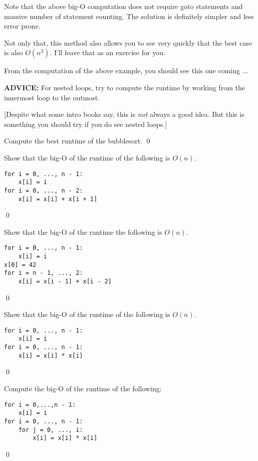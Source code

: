 \newpage

Note that the above big-O computation does not require goto statements
and massive number of statement counting.
The solution is definitely simpler and less error prone.

Not only that, this method also allows you to see very quickly
that the best case is also $O(n^2)$.
I'll leave that as an exercise for you.

From the computation of the above
example, you should see this one coming ...

\textbf{ADVICE:} For nested loops, try to  
compute the runtime by working from the innermost loop to the outmost.


[Despite what some intro books say, this is \textit{ not} always a good idea.
But this is something you should try if you do see nested loops.]


\begin{ex}
Compute the best runtime of the bubblesort.
\qed
\end{ex}

\begin{ex}
Show that the big-O of the runtime of the following is $O(n)$.
\begin{Verbatim}[frame=single, fontsize=\footnotesize]
for i = 0, ..., n - 1:
    x[i] = i
for i = 0, ..., n - 2:
    x[i] = x[i] + x[i + 1]
\end{Verbatim}
\qed
\end{ex}

\begin{ex}
Show that the big-O of the runtime the following is $O(n)$.
\begin{Verbatim}[frame=single, fontsize=\footnotesize]
for i = 0, ..., n - 1:
    x[i] = i
x[0] = 42
for i = n - 1, ..., 2:
    x[i] = x[i - 1] + x[i - 2]
\end{Verbatim}
\qed
\end{ex}


\begin{ex}
Show that the big-O of the runtime of the following is $O(n)$.
\begin{Verbatim}[frame=single, fontsize=\footnotesize]
for i = 0, ..., n - 1:
    x[i] = i
for i = 0, ..., n - 1:
    x[i] = x[i] * x[i]
\end{Verbatim}
\qed
\end{ex}


\begin{ex}
Compute the big-O of the runtime of the following:
\begin{Verbatim}[frame=single, fontsize=\footnotesize]
for i = 0,...,n - 1:
    x[i] = i
for i = 0, ..., n - 1:
    for j = 0, ..., i:
        x[i] = x[i] * x[i]
\end{Verbatim}
\qed
\end{ex}


